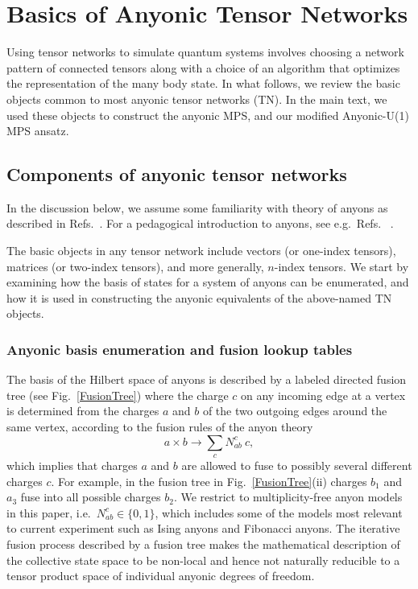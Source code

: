 \documentclass[aps,reprint,superscriptaddress,amsmath,amssymb,amsfonts,prb]{revtex4-1}
\begin{document}
\section{Basics of Anyonic Tensor Networks}\label{AnyonicTensorNetworks}
Using tensor networks to simulate quantum systems involves choosing a network pattern of connected tensors along with a choice of an algorithm that optimizes the representation of the many body state.\cite{Orus2013} In what follows, we review the basic objects common to most anyonic tensor networks (TN). In the main text, we used these objects to construct the anyonic MPS, and our modified Anyonic-U(1) MPS ansatz. 

\subsection{Components of anyonic tensor networks}
In the discussion below, we assume some familiarity with theory of anyons as described in Refs.~. For a pedagogical introduction to anyons, see e.g.~Refs. ~.

The basic objects in any tensor network include vectors (or one-index tensors),  matrices (or two-index tensors), and more generally, $n$-index tensors. We start by examining how the basis of states for a system of anyons can be enumerated, and how it is used in constructing the anyonic equivalents of the above-named TN objects. 
                                                                                                                 
\subsubsection{Anyonic basis enumeration and fusion lookup tables}
The basis of the Hilbert space of anyons is described by a labeled directed fusion tree (see Fig.~\ref{FusionTree}) where the charge $c$ on any incoming edge at a vertex is determined from the charges $a$ and $b$ of the two outgoing edges around the same vertex, according to the fusion rules of the anyon theory
\begin{equation}
 a \times b \rightarrow \sum_c N_{ab}^c ~ c ,
\end{equation}
which implies that charges $a$ and $b$ are allowed to fuse to possibly several different charges $c$. For example, in the fusion tree in Fig.~\ref{FusionTree}(ii) charges $b_1$ and $a_3$ fuse into all possible charges $b_2$. We restrict to multiplicity-free anyon models in this paper, i.e.~$N_{ab}^c \in\{0,1\}$, which includes some of the models most relevant to current experiment such as Ising anyons and Fibonacci anyons.
The iterative fusion process described by a fusion tree makes the mathematical description of the collective state space to be non-local and hence not naturally reducible to a tensor product space of individual anyonic degrees of freedom. 
\end{document}
